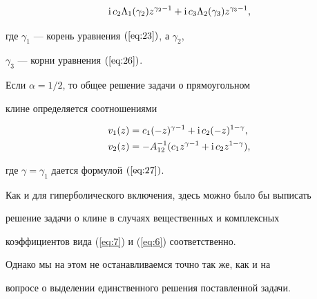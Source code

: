 \begin{thm}
\begin{align*}
\i c_2\Lambda_1(\gamma_2)z^{\gamma_2-1}+


\i c_3\Lambda_2(\gamma_3) z^{\gamma_3-1},


\end{align*}


где $\gamma_1$ --- корень уравнения $(\ref{eq:23})$, а $\gamma_2$,


$\gamma_3$ --- корни уравнения $(\ref{eq:26})$.





Если $\alpha=1/2$, то общее решение задачи о прямоугольном


клине определяется соотношениями


\begin{align*}


v_1(z)&=c_1(-z)^{\gamma-1}+\i c_2(-z)^{1-\gamma},\\


v_2(z)&=-A_{12}^{-1}(c_1z^{\gamma-1}+


\i c_2 z^{1-\gamma}),


\end{align*}


где $\gamma=\gamma_1$ дается формулой $(\ref{eq:27})$.


\end{thm}





Как и для гиперболического включения, здесь можно было бы выписать


решение задачи о клине в случаях вещественных и комплексных


коэффициентов вида (\ref{eq:7}) и (\ref{eq:6}) соответственно.


Однако мы на этом не останавливаемся точно так же, как и на


вопросе о выделении единственного решения поставленной задачи.








